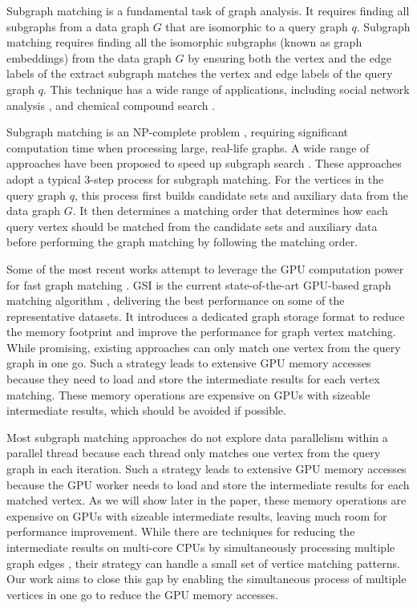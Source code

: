 Subgraph matching is a fundamental task of graph analysis. It requires finding all subgraphs from a data graph $G$ that are isomorphic to a
query graph $q$. Subgraph matching requires finding all the isomorphic subgraphs (known as graph embeddings) from the data graph $G$ by
ensuring both the vertex and the edge labels of the extract subgraph matches the vertex and edge labels of the query graph $q$. This
technique has a wide range of applications, including social network analysis \cite{wang2012truss,kairam2012The}, and chemical compound
search \cite{wooyoung2011Biological}.

Subgraph matching is an NP-complete problem \cite{garey1979Computers}, requiring significant computation time when processing large, real-life
graphs. A wide range of approaches have been proposed to speed up subgraph search
\cite{bhattarai2019ceci,guo2020gpu,tran2015fast,shi2020graphpi,bi2016efficient,zeng2020gsi,sun2020subgraph,guo2020exploiting,sun2020rapidmatch,lin2016network}.
These approaches adopt a typical 3-step process for subgraph matching. For the vertices in the query graph $q$, this process first builds
candidate sets and auxiliary data from the data graph $G$. It then determines a matching order that determines how each query vertex
should be matched from the candidate sets and auxiliary data before performing the graph matching by following the matching order.

Some of the most recent works attempt to leverage the GPU computation power for fast graph matching
\cite{lin2016network,guo2020gpu,tran2015fast,zeng2020gsi,guo2020exploiting}. GSI is the current state-of-the-art GPU-based graph matching
algorithm \cite{zeng2020gsi}, delivering the best performance on some of the representative datasets. It introduces a dedicated graph
storage format to reduce the memory footprint and improve the performance for graph vertex matching. While promising, existing approaches
can only match one vertex from the query graph in one go. Such a strategy leads to extensive GPU memory accesses because they need to load
and store the intermediate results for each vertex matching. These memory operations are expensive on GPUs with sizeable intermediate
results, which should be avoided if possible.


Most subgraph matching approaches do not explore data parallelism within a parallel thread because each thread only matches one vertex from
the query graph in each iteration. Such a strategy leads to extensive GPU memory accesses because the GPU worker needs to load and store
the intermediate results for each matched vertex. As we will show later in the paper, these memory operations are expensive on GPUs with
sizeable intermediate results, leaving much room for performance improvement. While there are techniques for reducing the intermediate
results on multi-core CPUs by simultaneously processing multiple graph edges \cite{lai2015scalable}, their strategy can handle a small set
of vertice matching patterns. Our work aims to close this gap by enabling the simultaneous process of multiple vertices in one go to reduce
the GPU memory accesses.

